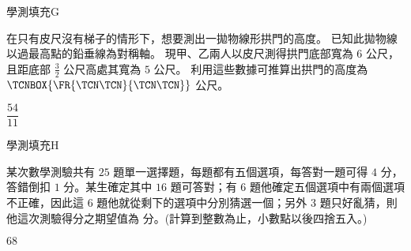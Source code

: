     \begin{QUESTION}
        \begin{ExamInfo}{92}{學測}{填充}{G}
        \end{ExamInfo}
        \begin{ExamAnsRateInfo}{15}{41}{4}{0}
        \end{ExamAnsRateInfo}
        \begin{QBODY}
            在只有皮尺沒有梯子的情形下，想要測出一拋物線形拱門的高度。
            已知此拋物線以過最高點的鉛垂線為對稱軸。
            現甲、乙兩人以皮尺測得拱門底部寬為 $6$ 公尺，且距底部 $\frac{3}{2}$ 公尺高處其寬為 $5$ 公尺。
            利用這些數據可推算出拱門的高度為$\TCNBOX{\FR{\TCN\TCN}{\TCN\TCN}}$ 公尺。
        \end{QBODY}
        \begin{QFROMS}
        \end{QFROMS}
        \begin{QTAGS}\end{QTAGS}
        \begin{QANS}
            $\dfrac{54}{11}$
        \end{QANS}
        \begin{QSOLLIST}
        \end{QSOLLIST}
        \begin{QEMPTYSPACE}
        \end{QEMPTYSPACE}
    \end{QUESTION}
    \begin{QUESTION}
        \begin{ExamInfo}{92}{學測}{填充}{H}
        \end{ExamInfo}
        \begin{ExamAnsRateInfo}{17}{36}{12}{3}
        \end{ExamAnsRateInfo}
        \begin{QBODY}
            某次數學測驗共有 $25$ 題單一選擇題，每題都有五個選項，每答對一題可得 $4$ 分，答錯倒扣 $1$ 分。某生確定其中 $16$ 題可答對；有 $6$ 題他確定五個選項中有兩個選項不正確，因此這 $6$ 題他就從剩下的選項中分別猜選一個；另外 $3$ 題只好亂猜，則他這次測驗得分之期望值為 
            \TCNBOX{\TCN\TCN} 分。(計算到整數為止，小數點以後四捨五入。)
        \end{QBODY}
        \begin{QFROMS}
        \end{QFROMS}
        \begin{QTAGS}\end{QTAGS}
        \begin{QANS}
            $68$
        \end{QANS}
        \begin{QSOLLIST}
        \end{QSOLLIST}
        \begin{QEMPTYSPACE}
        \end{QEMPTYSPACE}
    \end{QUESTION}
